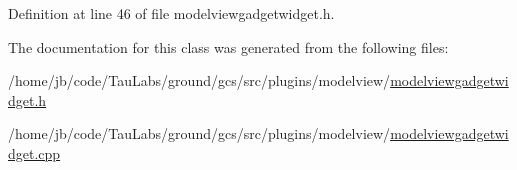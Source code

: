 \-Definition at line 46 of file modelviewgadgetwidget.\-h.



\-The documentation for this class was generated from the following files\-:\begin{DoxyCompactItemize}
\item 
/home/jb/code/\-Tau\-Labs/ground/gcs/src/plugins/modelview/\hyperlink{modelviewgadgetwidget_8h}{modelviewgadgetwidget.\-h}\item 
/home/jb/code/\-Tau\-Labs/ground/gcs/src/plugins/modelview/\hyperlink{modelviewgadgetwidget_8cpp}{modelviewgadgetwidget.\-cpp}\end{DoxyCompactItemize}
